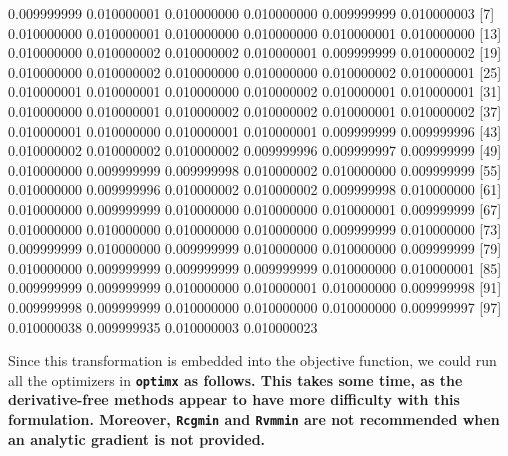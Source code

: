 \documentclass[11pt]{article}
\newcommand{\code}[1]{{\tt#1}}
\newcommand{\pkg}[1]{\bf{\tt#1}\rm }
\begin{document}
\begin{Schunk}
\begin{Soutput}
  [1] 0.009999999 0.010000001 0.010000000 0.010000000 0.009999999 0.010000003
  [7] 0.010000000 0.010000001 0.010000000 0.010000000 0.010000001 0.010000000
 [13] 0.010000000 0.010000002 0.010000002 0.010000001 0.009999999 0.010000002
 [19] 0.010000000 0.010000002 0.010000000 0.010000000 0.010000002 0.010000001
 [25] 0.010000001 0.010000001 0.010000000 0.010000002 0.010000001 0.010000001
 [31] 0.010000000 0.010000001 0.010000002 0.010000002 0.010000001 0.010000002
 [37] 0.010000001 0.010000000 0.010000001 0.010000001 0.009999999 0.009999996
 [43] 0.010000002 0.010000002 0.010000002 0.009999996 0.009999997 0.009999999
 [49] 0.010000000 0.009999999 0.009999998 0.010000002 0.010000000 0.009999999
 [55] 0.010000000 0.009999996 0.010000002 0.010000002 0.009999998 0.010000000
 [61] 0.010000000 0.009999999 0.010000000 0.010000000 0.010000001 0.009999999
 [67] 0.010000000 0.010000000 0.010000000 0.010000000 0.009999999 0.010000000
 [73] 0.009999999 0.010000000 0.009999999 0.010000000 0.010000000 0.009999999
 [79] 0.010000000 0.009999999 0.009999999 0.009999999 0.010000000 0.010000001
 [85] 0.009999999 0.009999999 0.010000000 0.010000001 0.010000000 0.009999998
 [91] 0.009999998 0.009999999 0.010000000 0.010000000 0.010000000 0.009999997
 [97] 0.010000038 0.009999935 0.010000003 0.010000023
\end{Soutput}
\end{Schunk}

Since this transformation is embedded into the objective function, we could run all the
optimizers in \pkg{optimx} as follows. This takes some time, as the derivative-free
methods appear to have more difficulty with this formulation. Moreover, \code{Rcgmin}
and \code{Rvmmin} are not recommended when an analytic gradient is not provided.
\end{document}
